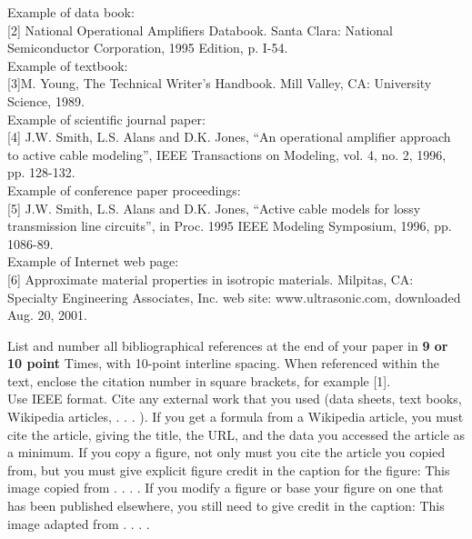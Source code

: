 \documentclass[journal]{IEEEtran}
\begin{document}
Example of data book:\\[0.1in]
[2] National Operational Amplifiers Databook. Santa Clara: National Semiconductor
Corporation, 1995 Edition, p. I-54. \\[0.1in]
Example of textbook: \\[0.1in]
[3]M. Young, The Technical Writer’s Handbook. Mill Valley, CA: University Science, 1989.\\[0.1in]
Example of scientific journal paper:\\[0.1in]
[4] J.W. Smith, L.S. Alans and D.K. Jones, “An operational amplifier approach to
active cable modeling”, IEEE Transactions on Modeling, vol. 4, no. 2, 1996, pp.
128-132.\\[0.1in]
Example of conference paper proceedings:\\[0.1in]
[5] J.W. Smith, L.S. Alans and D.K. Jones, “Active cable models for lossy
transmission line circuits”, in Proc. 1995 IEEE Modeling Symposium, 1996, pp.
1086-89.\\[0.1in]

Example of Internet web page:\\[0.1in]
[6] Approximate material properties in isotropic materials. Milpitas, CA: Specialty
Engineering Associates, Inc. web site: www.ultrasonic.com, downloaded Aug. 20,
2001. 

List and number all bibliographical 
references at the end of your paper in {\bf 9 or 10 point} Times, with 10-point interline spacing. When referenced within the text, enclose the citation number in square brackets, for example [1]. \\
Use IEEE format. Cite any external work that you used (data sheets, text books, Wikipedia articles, . . . ). If you get a formula from a Wikipedia article, you must cite the article, giving the title, the URL, and the data you accessed the article as a minimum. If you copy a figure, not only must you cite the article you copied from, but you must give explicit figure credit in the caption for the figure: This image copied from . . . . If you modify a figure or base your figure on one that has been published elsewhere, you still need to give credit in the caption: This image adapted from . . . .\\[0.1in]

\end{document}

